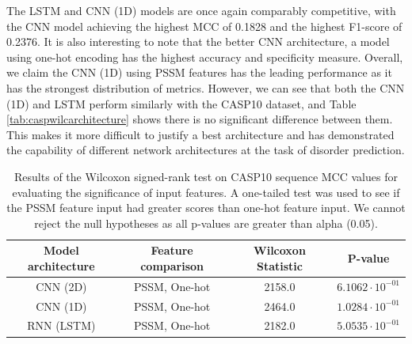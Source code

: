 \documentclass{l4proj}
\begin{document}
The LSTM and CNN (1D) models are once again comparably competitive, with the CNN model achieving the highest MCC of 0.1828 and the highest F1-score of 0.2376. It is also interesting to note that the better CNN architecture, a model using one-hot encoding has the highest accuracy and specificity measure. Overall, we claim the CNN (1D) using PSSM features has the leading performance as it has the strongest distribution of metrics. However, we can see that both the CNN (1D) and LSTM perform similarly with the CASP10 dataset, and Table \ref{tab:caspwilcarchitecture} shows there is no significant difference between them. This makes it more difficult to justify a best architecture and has demonstrated the capability of different network architectures at the task of disorder prediction.

\begin{table}[!ht]
    \centering
    \caption{Results of the Wilcoxon signed-rank test on CASP10 sequence MCC values for evaluating the significance of input features. A one-tailed test was used to see if the PSSM feature input had greater scores than one-hot feature input. We cannot reject the null hypotheses as all p-values are greater than alpha (0.05).}
    \begin{tabular}{@{}cccc@{}}
    \toprule
    Model architecture & Feature comparison & Wilcoxon Statistic & P-value \\ \midrule
    CNN (2D) & PSSM, One-hot & 2158.0 & $6.1062\cdot{10^{-01}}$ \\
    CNN (1D) & PSSM, One-hot & 2464.0 & $1.0284\cdot{10^{-01}}$ \\
    RNN (LSTM) & PSSM, One-hot & 2182.0 & $5.0535\cdot{10^{-01}}$ \\ \bottomrule
    \end{tabular}
    
    \label{tab:caspwilcinput}
\end{table}
\end{document}
